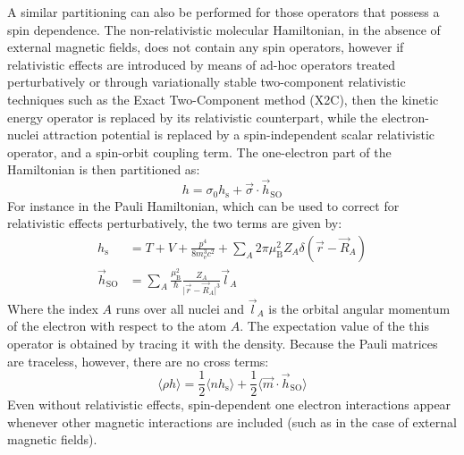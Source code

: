 \documentclass[12pt]{article}
\newcommand{\ev}[1]{\langle #1 \rangle}
\begin{document}
A similar partitioning can also be performed for those operators that possess a spin dependence.
The non-relativistic molecular Hamiltonian, in the absence of external magnetic fields, does not contain any spin operators, however if relativistic effects are introduced by means of ad-hoc operators treated perturbatively or through variationally stable two-component relativistic techniques such as the Exact Two-Component method (X2C),\cite{Liu09_219,Liu10_532,Liu09_1945,Saue09_2091} then the kinetic energy operator is replaced by its relativistic counterpart, while the electron-nuclei attraction potential is replaced by a spin-independent scalar relativistic operator, and a spin-orbit coupling term.
The one-electron part of the Hamiltonian is then partitioned as:
\begin{equation}
 h = \sigma_0 h_\mathrm{s} + \vec{\sigma}\cdot\vec{h}_\mathrm{SO}
\end{equation}
For instance in the Pauli Hamiltonian, which can be used to correct for relativistic effects perturbatively, the two terms are given by:
\begin{align}
 h_\mathrm{s} &= T + V + \frac{p^4}{8m_\mathrm{e}^3c^2} + \sum_A 2\pi\mu_\mathrm{B}^2 Z_A\delta(\vec{r}-\vec{R}_A) \\
 \vec{h}_\mathrm{SO} &= \sum_A\frac{\mu_\mathrm{B}^2}{\hbar}\frac{Z_A}{\vert\vec{r}-\vec{R}_A\vert^3}\vec{l}_A
\end{align}
Where the index $A$ runs over all nuclei and $\vec{l}_A$ is the orbital angular momentum of the electron with respect to the atom $A$.
The expectation value of the this operator is obtained by tracing it with the density.
Because the Pauli matrices are traceless, however, there are no cross terms:
\begin{equation}
 \ev{\rho h} = \frac{1}{2}\ev{nh_\mathrm{s}} + \frac{1}{2}\ev{\vec{m}\cdot\vec{h}_\mathrm{SO}}
\end{equation}
Even without relativistic effects, spin-dependent one electron interactions appear whenever other magnetic interactions are included (such as in the case of external magnetic fields).
\end{document}
